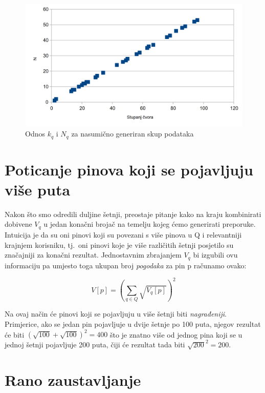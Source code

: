 \documentclass[times, utf8, seminar]{fer}
\begin{document}
\begin{figure}[h]
	\centering
	\includegraphics[width=\textwidth]{degree_chart}
	\caption{Odnos $k_q$ i $N_q$ za nasumično generiran skup podataka}
	\label{fig:pins_boards}
\end{figure}

\section{Poticanje pinova koji se pojavljuju više puta}
\label{boosting}

Nakon što smo odredili duljine šetnji, preostaje pitanje kako na kraju kombinirati dobivene $V_q$ u jedan konačni brojač na temelju kojeg ćemo generirati preporuke. Intuicija je da su oni pinovi koji su povezani s više pinova u Q i relevantniji krajnjem korisniku, tj.\ oni pinovi koje je više različitih šetnji posjetilo su značajniji za konačni rezultat. Jednostavnim zbrajanjem $V_q$ bi izgubili ovu informaciju pa umjesto toga ukupan broj \textit{pogodaka} za pin p računamo ovako:

\begin{centering}
		  $$ V[p] = (\sum_{q \in Q}{\sqrt{V_q[p]}})^2 $$
		  \par
\end{centering}

Na ovaj način će pinovi koji se pojavljuju u više šetnji biti \textit{nagrađeniji}. Primjerice, ako se jedan pin pojavljuje u dvije šetnje po 100 puta, njegov rezultat će biti $ (\sqrt{100} + \sqrt{100})^2 = 400 $ što je znatno više od jednog pina koji se u jednoj šetnji pojavljuje 200 puta, čiji će rezultat tada biti $ \sqrt{200}^2 = 200 $.

\section{Rano zaustavljanje}
\label{early-stop}
\end{document}
